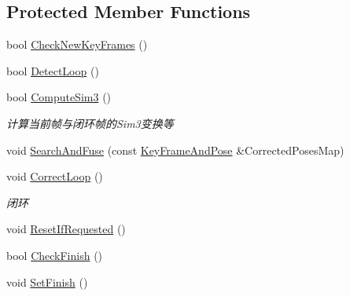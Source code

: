 \subsection*{Protected Member Functions}
\begin{DoxyCompactItemize}
\item 
bool \mbox{\hyperlink{class_o_r_b___s_l_a_m2_1_1_loop_closing_ac0c81e654509eb9384abe5e769db4f41}{Check\+New\+Key\+Frames}} ()
\item 
bool \mbox{\hyperlink{class_o_r_b___s_l_a_m2_1_1_loop_closing_aa8110ca79cebaf509e378d30e55f1381}{Detect\+Loop}} ()
\item 
bool \mbox{\hyperlink{class_o_r_b___s_l_a_m2_1_1_loop_closing_ab4fcf814eed5b5dd2aec96454561b078}{Compute\+Sim3}} ()
\begin{DoxyCompactList}\small\item\em 计算当前帧与闭环帧的\+Sim3变换等 \end{DoxyCompactList}\item 
void \mbox{\hyperlink{class_o_r_b___s_l_a_m2_1_1_loop_closing_aabe9d9b913f36b607c67b0ed0df42a1d}{Search\+And\+Fuse}} (const \mbox{\hyperlink{class_o_r_b___s_l_a_m2_1_1_loop_closing_ae9ada143a8308ce32990a7c7b5d533ab}{Key\+Frame\+And\+Pose}} \&Corrected\+Poses\+Map)
\item 
void \mbox{\hyperlink{class_o_r_b___s_l_a_m2_1_1_loop_closing_aa007e0678582ec0de5d71280d23af540}{Correct\+Loop}} ()
\begin{DoxyCompactList}\small\item\em 闭环 \end{DoxyCompactList}\item 
void \mbox{\hyperlink{class_o_r_b___s_l_a_m2_1_1_loop_closing_a288545384b48c758f910a4762c873733}{Reset\+If\+Requested}} ()
\item 
bool \mbox{\hyperlink{class_o_r_b___s_l_a_m2_1_1_loop_closing_ac13b01270b4daef9be2a098f82e9f64f}{Check\+Finish}} ()
\item 
void \mbox{\hyperlink{class_o_r_b___s_l_a_m2_1_1_loop_closing_aeea102bfacf8538ef605d76e4192a622}{Set\+Finish}} ()
\end{DoxyCompactItemize}
